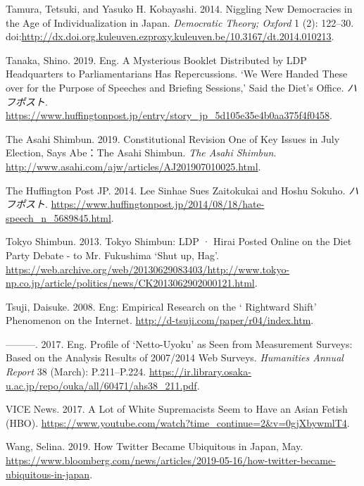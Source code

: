 \documentclass[10pt,british,A4paper,,openany]{memoir}
\begin{document}
\hypertarget{ref-tamura_niggling_2014}{}
Tamura, Tetsuki, and Yasuko H. Kobayashi. 2014. Niggling New Democracies
in the Age of Individualization in Japan. \emph{Democratic Theory;
Oxford} 1 (2): 122--30.
doi:\href{https://doi.org/http://dx.doi.org.kuleuven.ezproxy.kuleuven.be/10.3167/dt.2014.010213}{http://dx.doi.org.kuleuven.ezproxy.kuleuven.be/10.3167/dt.2014.010213}.

\hypertarget{ref-tanaka_eng._2019}{}
Tanaka, Shino. 2019. Eng. A Mysterious Booklet Distributed by LDP
Headquarters to Parliamentarians Has Repercussions. `We Were Handed
These over for the Purpose of Speeches and Briefing Sessions,' Said the
Diet's Office. \emph{ハフポスト}.
\url{https://www.huffingtonpost.jp/entry/story_jp_5d105e35e4b0aa375f4f0458}.

\hypertarget{ref-the_asahi_shimbun_constitutional_2019}{}
The Asahi Shimbun. 2019. Constitutional Revision One of Key Issues in
July Election, Says Abe：The Asahi Shimbun. \emph{The Asahi Shimbun}.
\url{http://www.asahi.com/ajw/articles/AJ201907010025.html}.

\hypertarget{ref-the_huffington_post_jp_lee_2014}{}
The Huffington Post JP. 2014. Lee Sinhae Sues Zaitokukai and Hoshu
Sokuho. \emph{ハフポスト}.
\url{https://www.huffingtonpost.jp/2014/08/18/hate-speech_n_5689845.html}.

\hypertarget{ref-tokyo_shimbun_tokyo_2013}{}
Tokyo Shimbun. 2013. Tokyo Shimbun: LDP · Hirai Posted Online on the
Diet Party Debate - to Mr. Fukushima `Shut up, Hag'.
\url{https://web.archive.org/web/20130629083403/http://www.tokyo-np.co.jp/article/politics/news/CK2013062902000121.html}.

\hypertarget{ref-tsuji_eng:_2008}{}
Tsuji, Daisuke. 2008. Eng: Empirical Research on the ` Rightward Shift'
Phenomenon on the Internet.
\url{http://d-tsuji.com/paper/r04/index.htm}.

\hypertarget{ref-tsuji_eng._2017}{}
---------. 2017. Eng. Profile of `Netto-Uyoku' as Seen from Measurement
Surveys: Based on the Analysis Results of 2007/2014 Web Surveys.
\emph{Humanities Annual Report} 38 (March): P.211--P.224.
\url{https://ir.library.osaka-u.ac.jp/repo/ouka/all/60471/ahs38_211.pdf}.

\hypertarget{ref-vice_news_lot_2017}{}
VICE News. 2017. A Lot of White Supremacists Seem to Have an Asian
Fetish (HBO).
\url{https://www.youtube.com/watch?time_continue=2\&v=0gjXbywmlT4}.

\hypertarget{ref-wang_how_2019}{}
Wang, Selina. 2019. How Twitter Became Ubiquitous in Japan, May.
\url{https://www.bloomberg.com/news/articles/2019-05-16/how-twitter-became-ubiquitous-in-japan}.
\end{document}
